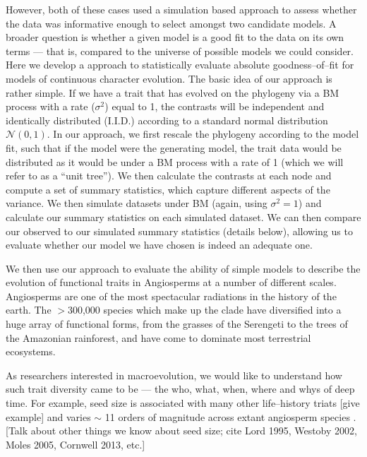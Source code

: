 \documentclass[12pt]{article}
\begin{document}
However, both of these cases used a simulation based approach to assess whether the data was informative enough to select amongst two candidate models. A broader question is whether a given model is a good fit to the data on its own terms --- that is, compared to the universe of possible models we could consider. Here we develop a approach to statistically evaluate absolute goodness--of--fit for models of continuous character evolution. The basic idea of our approach is rather simple. If we have a trait that has evolved on the phylogeny via a BM process with a rate ($\sigma^2$) equal to 1, the contrasts \citep[\textit{sensu}][see below]{Felsenstein1985} will be independent and identically distributed (I.I.D.) according to a standard normal distribution $\mathcal{N}(0,1)$. In our approach, we first rescale the phylogeny according to the model fit, such that if the model were the generating model, the trait data would be distributed as it would be under a BM process with a rate of 1 (which we will refer to as a ``unit tree''). We then calculate the contrasts at each node and compute a set of summary statistics, which capture different aspects of the variance. We then simulate datasets under BM (again, using $\sigma^2 = 1$) and calculate our summary statistics on each simulated dataset. We can then compare our observed to our simulated summary statistics (details below), allowing us to evaluate whether our model we have chosen is indeed an adequate one.

We then use our approach to evaluate the ability of simple models to describe the evolution of functional traits in Angiosperms at a number of different scales. Angiosperms are one of the most spectacular radiations in the history of the earth. The $>$300,000 species which make up the clade have diversified into a huge array of functional forms, from the grasses of the Serengeti to the trees of the Amazonian rainforest, and have come to dominate most terrestrial ecosystems.

As researchers interested in macroevolution, we would like to understand how such trait diversity came to be --- the who, what, when, where and whys of deep time. For example, seed size is associated with many other life--history triats [give example] and varies $\sim$ 11 orders of magnitude across extant angiosperm species \citep{Westoby1992TREE, Moles2005}. [Talk about other things we know about seed size; cite Lord 1995, Westoby 2002, Moles 2005, Cornwell 2013, etc.]
\end{document}
